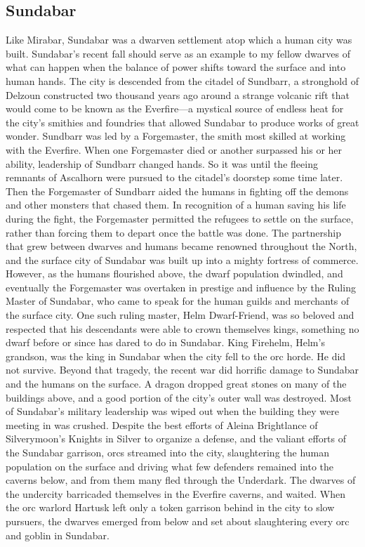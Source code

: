 \documentclass[10pt,a4paper,twoside,twocolumn,openany,bg=print,nodeprecatedcode]{dndbook}
\begin{document}
\subsection{Sundabar}
Like Mirabar, Sundabar was a dwarven settlement atop which a human city was built. Sundabar's recent fall should serve as an example to my fellow dwarves of what can happen when the balance of power shifts toward the surface and into human hands.
The city is descended from the citadel of Sundbarr, a stronghold of Delzoun constructed two thousand years ago around a strange volcanic rift that would come to be known as the Everfire—a mystical source of endless heat for the city's smithies and foundries that allowed Sundabar to produce works of great wonder. Sundbarr was led by a Forgemaster, the smith most skilled at working with the Everfire. When one Forgemaster died or another surpassed his or her ability, leadership of Sundbarr changed hands.
So it was until the fleeing remnants of Ascalhorn were pursued to the citadel's doorstep some time later. Then the Forgemaster of Sundbarr aided the humans in fighting off the demons and other monsters that chased them. In recognition of a human saving his life during the fight, the Forgemaster permitted the refugees to settle on the surface, rather than forcing them to depart once the battle was done. The partnership that grew between dwarves and humans became renowned throughout the North, and the surface city of Sundabar was built up into a mighty fortress of commerce.
However, as the humans flourished above, the dwarf population dwindled, and eventually the Forgemaster was overtaken in prestige and influence by the Ruling Master of Sundabar, who came to speak for the human guilds and merchants of the surface city. One such ruling master, Helm Dwarf-Friend, was so beloved and respected that his descendants were able to crown themselves kings, something no dwarf before or since has dared to do in Sundabar.
King Firehelm, Helm's grandson, was the king in Sundabar when the city fell to the orc horde. He did not survive. Beyond that tragedy, the recent war did horrific damage to Sundabar and the humans on the surface. A dragon dropped great stones on many of the buildings above, and a good portion of the city's outer wall was destroyed. Most of Sundabar's military leadership was wiped out when the building they were meeting in was crushed. Despite the best efforts of Aleina Brightlance of Silverymoon's Knights in Silver to organize a defense, and the valiant efforts of the Sundabar garrison, orcs streamed into the city, slaughtering the human population on the surface and driving what few defenders remained into the caverns below, and from them many fled through the Underdark. The dwarves of the undercity barricaded themselves in the Everfire caverns, and waited. When the orc warlord Hartusk left only a token garrison behind in the city to slow pursuers, the dwarves emerged from below and set about slaughtering every orc and goblin in Sundabar.
\end{document}
